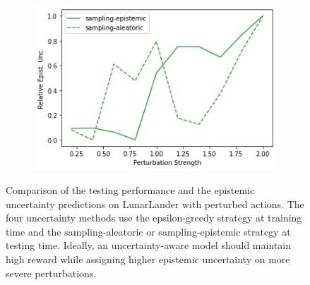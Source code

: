 \begin{figure}
\begin{subfigure}{.245\textwidth}
    \end{subfigure}
    \begin{subfigure}{.245\textwidth}
        \includegraphics[width=\textwidth]{sections/011_icml2022/resources/action_shift-PostNet-LunarLanderShift-v0-mean_epistemic_uncertainty_.png}
    \end{subfigure}
    \caption{Comparison of the testing performance and the epistemic uncertainty predictions on LunarLander with perturbed actions. The four uncertainty methods use the epsilon-greedy strategy at training time and the sampling-aleatoric or sampling-epistemic strategy at testing time. Ideally, an uncertainty-aware model should maintain high reward while assigning higher epistemic uncertainty on more severe perturbations.}
    \label{fig:strategy-action-shift-testing-performance-lunarlander}
\end{figure}